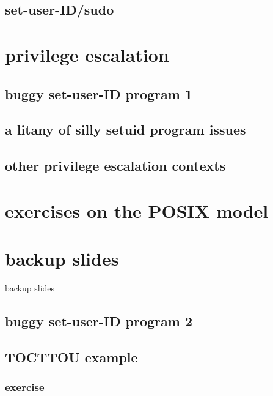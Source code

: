 \subsection{set-user-ID/sudo}


\section{privilege escalation}


\subsection{buggy set-user-ID program 1}


\subsection{a litany of silly setuid program issues}


\subsection{other privilege escalation contexts}


\section{exercises on the POSIX model}


\section{backup slides}
\begin{frame}{backup slides}
\end{frame}

\subsection{buggy set-user-ID program 2}


\subsection{TOCTTOU example}




\subsubsection{exercise}


